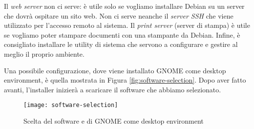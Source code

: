 Il \textit{web server} non ci serve: è utile solo se vogliamo installare Debian su un server che dovrà ospitare un sito web. Non ci serve neanche il \textit{server SSH} che viene utilizzato per l'accesso remoto al sistema. Il \textit{print server} (server di stampa) è utile se vogliamo poter stampare documenti con una stampante da Debian. Infine, è consigliato installare le utility di sistema che servono a configurare e gestire al meglio il proprio ambiente.

Una possibile configurazione, dove viene installato GNOME come desktop environment, è quella mostrata in Figura \vref{fig:software-selection}. Dopo aver fatto avanti, l'installer inizierà a scaricare il software che abbiamo selezionato.

\begin{figure}[ht]
	\centering
	\texttt{[image: software-selection]}
	\caption{Scelta del software e di GNOME come desktop environment}
	\label{fig:software-selection}
\end{figure}
